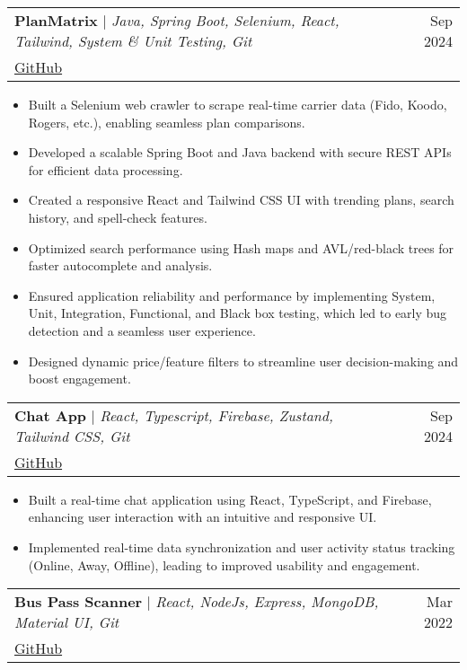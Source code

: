 \documentclass[letterpaper,11pt]{article}
\makeatletter
\newcommand{\resumeItem}[1]{
  \item\small{
    {#1 \vspace{-2pt}}
  }
}
\newcommand{\resumeProjectHeading}[3]{
    \item
    \begin{tabular*}{0.97\textwidth}{l@{\extracolsep{\fill}}r}
      \small#1 & #2 \\
      \multicolumn{2}{l}{\footnotesize#3} \\
    \end{tabular*}\vspace{-7pt}
}
\newcommand{\resumeItemListStart}{\begin{itemize}}
\newcommand{\resumeItemListEnd}{\end{itemize}\vspace{-5pt}}
\makeatother
\begin{document}
      \resumeProjectHeading
          {\textbf{PlanMatrix} $|$ \emph{ Java, Spring Boot, Selenium, React, Tailwind, System \& Unit Testing, Git}}{Sep 2024}
          {\href{https://github.com/Sanjay-10/PlanMatrix}{\underline{GitHub}}}
          \resumeItemListStart
            \resumeItem{Built a Selenium web crawler to scrape real-time carrier data (Fido, Koodo, Rogers, etc.), enabling seamless plan
            comparisons.}
            \resumeItem{ Developed a scalable Spring Boot and Java backend with secure REST APIs for efficient data processing.}
            \resumeItem{ Created a responsive React and Tailwind CSS UI with trending plans, search history, and spell-check features.}
            \resumeItem{ Optimized search performance using Hash maps and AVL/red-black trees for faster autocomplete and analysis.}
            \resumeItem{ Ensured application reliability and performance by implementing System, Unit, Integration, Functional, and Black
            box testing, which led to early bug detection and a seamless user experience.}
            \resumeItem{ Designed dynamic price/feature filters to streamline user decision-making and boost engagement.}
          \resumeItemListEnd
      \resumeProjectHeading
          {\textbf{Chat App} $|$ \emph{React, Typescript, Firebase, Zustand, Tailwind CSS, Git}}{Sep 2024}
          {\href{https://github.com/aaryen-dsouza/chat-app}{\underline{GitHub}}}
          \resumeItemListStart
            \resumeItem{Built a real-time chat application using React, TypeScript, and Firebase, enhancing user interaction with an intuitive and responsive UI.}
            \resumeItem{Implemented real-time data synchronization and user activity status tracking (Online, Away, Offline), leading to improved usability and engagement.}
          \resumeItemListEnd
      \resumeProjectHeading
          {\textbf{Bus Pass Scanner} $|$ \emph{React, NodeJs, Express, MongoDB, Material UI, Git}}{Mar 2022}
          {\href{https://github.com/aaryen-dsouza/BusPass_Scanner}{\underline{GitHub}}}
\end{document}
